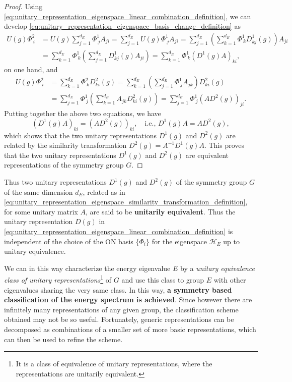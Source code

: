 \begin{proof}
    Using \eqref{eq:unitary_representation_eigenspace_linear_combination_definition}, we can develop \eqref{eq:unitary_representation_eigenspace_basis_change_definition} as
    \[
        \begin{aligned}
            U(g) \Phi_{\ i}^2 & = U(g) \sum_{j=1}^{d_E} \Phi_{\ j}^1 A_{ji} = \sum_{j=1}^{d_E} U(g) \Phi_{\ j}^1 A_{ji} = \sum_{j=1}^{d_E} \left( \sum_{k=1}^{d_E} \Phi_{\ k}^1 D_{kj}^1(g) \right) A_{ji} \\
                              & = \sum_{k=1}^{d_E} \Phi_{\ k}^1 \left( \sum_{j=1}^{d_E} D_{kj}^1(g) A_{ji} \right) = \sum_{k=1}^{d_E} \Phi_{\ k}^1 (D^1(g) A)_{ki},
        \end{aligned}
    \]
    on one hand, and
    \[
        \begin{aligned}
            U(g) \Phi_{\ i}^2 & = \sum_{k=1}^{d_E} \Phi_{\ k}^2 D_{ki}^2(g) = \sum_{k=1}^{d_E} \left( \sum_{j=1}^{d_E} \Phi_{\ j}^1 A_{jk} \right) D_{ki}^2(g)      \\
                              & = \sum_{j=1}^{d_E} \Phi_{\ j}^1 \left( \sum_{k=1}^{d_E} A_{jk} D_{ki}^2(g) \right) = \sum_{j=1}^{d_E} \Phi_{\ j}^1 (A D^2(g))_{ji}.
        \end{aligned}
    \]
    Putting together the above two equations, we have
    \[
        (D^1(g) A)_{ki} = (A D^2(g))_{ki}, \quad \text{i.e., } D^1(g) A = A D^2(g),
    \]
    which shows that the two unitary representations \(D^1(g)\) and \(D^2(g)\) are related by the similarity transformation \(D^2(g) = A^{-1} D^1(g) A\). This proves that the two unitary representations \(D^1(g)\) and \(D^2(g)\) are equivalent representations of the symmetry group \(G\).
\end{proof}

Thus two unitary representations \(D^1(g)\) and \(D^2(g)\) of the symmetry group \(G\) of the same dimension \(d_E\), related as in \eqref{eq:unitary_representation_eigenspace_similarity_transformation_definition}, for some unitary matrix \(A\), are said to be \textbf{unitarily equivalent}. Thus the unitary representation \(D(g)\) in \eqref{eq:unitary_representation_eigenspace_linear_combination_definition} is independent of the choice of the ON basis \(\{\Phi_i\}\) for the eigenspace \(\mathcal{H}_E\) up to unitary equivalence.

We can in this way characterize the energy eigenvalue \(E\) by a \textit{unitary equivalence class of unitary representations}\footnote{It is a class of equivalence of unitary representations, where the representations are unitarily equivalent.} of \(G\) and use this class to group \(E\) with other eigenvalues sharing the very same class. In this way, \textbf{a symmetry based classification of the energy spectrum is achieved}. Since however there are infinitely many representations of any given group, the classification scheme obtained may not be so useful. Fortunately, generic representations can be decomposed as combinations of a smaller set of more basic representations, which can then be used to refine the scheme.

